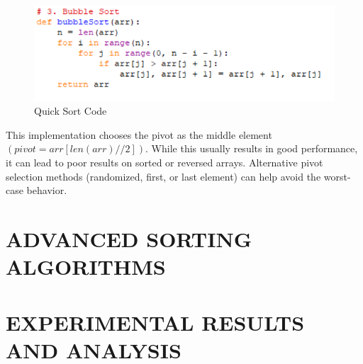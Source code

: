 \documentclass[sigconf]{acmart}
\begin{document}
\begin{figure}[t]
\centering
\includegraphics[width=0.85\linewidth]{figures/006.pdf}
\vspace{-0.3cm}
\caption{Quick Sort Code}  
\vspace{-0.35cm}
\label{fig:proportion}
\end{figure}

This implementation chooses the pivot as the middle element $(pivot = arr[len(arr) // 2])$. While this usually results in good performance, it can lead to poor results on sorted or reversed arrays. Alternative pivot selection methods (randomized, first, or last element) can help avoid the worst-case behavior.

\section{ADVANCED SORTING ALGORITHMS}
\lipsum[1]

\section{EXPERIMENTAL RESULTS AND ANALYSIS}
\lipsum[1]


% 
% 
\end{document}
